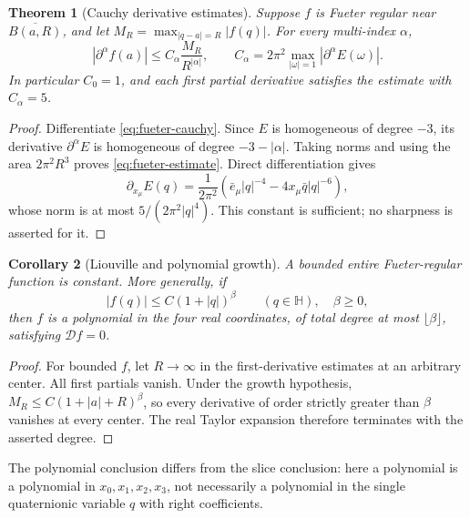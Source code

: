 \documentclass[11pt,a4paper]{article}
\numberwithin{equation}{section}
\newtheorem{theorem}{Theorem}[section]
\newtheorem{corollary}[theorem]{Corollary}
\theoremstyle{definition}
\theoremstyle{remark}
\newcommand{\HH}{\mathbb H}
\newcommand{\cD}{\mathcal D}
\begin{document}
\begin{theorem}[Cauchy derivative estimates]\label{thm:fueter-estimates}
Suppose $f$ is Fueter regular near $\overline{B(a,R)}$, and let
$M_R=\max_{|q-a|=R}|f(q)|$. For every multi-index $\alpha$,
\begin{equation}\label{eq:fueter-estimate}
 |\partial^\alpha f(a)|\le
 C_\alpha\frac{M_R}{R^{|\alpha|}},
 \qquad
 C_\alpha=2\pi^2\max_{|\omega|=1}|\partial^\alpha E(\omega)|.
\end{equation}
In particular $C_0=1$, and each first partial derivative satisfies the
estimate with $C_\alpha=5$.
\end{theorem}
\begin{proof}
Differentiate \eqref{eq:fueter-cauchy}. Since $E$ is homogeneous of degree
$-3$, its derivative $\partial^\alpha E$ is homogeneous of degree
$-3-|\alpha|$. Taking norms and using the area $2\pi^2R^3$ proves
\eqref{eq:fueter-estimate}. Direct differentiation gives
\[
 \partial_{x_\mu}E(q)=\frac{1}{2\pi^2}
 \left(\bar e_\mu|q|^{-4}-4x_\mu\bar q|q|^{-6}\right),
\]
whose norm is at most $5/(2\pi^2|q|^4)$. This constant is sufficient; no
sharpness is asserted for it.
\end{proof}

\begin{corollary}[Liouville and polynomial growth]\label{cor:fueter-liouville}
A bounded entire Fueter-regular function is constant. More generally, if
\[
 |f(q)|\le C(1+|q|)^\beta\qquad(q\in\HH),\quad\beta\ge0,
\]
then $f$ is a polynomial in the four real coordinates, of total degree at
most $\lfloor\beta\rfloor$, satisfying $\cD f=0$.
\end{corollary}
\begin{proof}
For bounded $f$, let $R\to\infty$ in the first-derivative estimates at an
arbitrary center. All first partials vanish. Under the growth hypothesis,
$M_R\le C(1+|a|+R)^\beta$, so every derivative of order strictly greater than
$\beta$ vanishes at every center. The real Taylor expansion therefore
terminates with the asserted degree.
\end{proof}
The polynomial conclusion differs from the slice conclusion: here a
polynomial is a polynomial in $x_0,x_1,x_2,x_3$, not necessarily a polynomial
in the single quaternionic variable $q$ with right coefficients.
\end{document}
